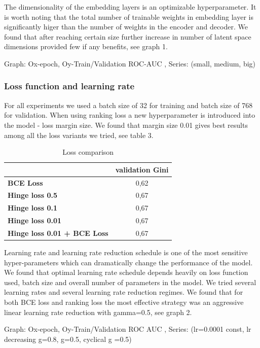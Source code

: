 \documentclass{sigkddExp}
\begin{document}
The dimensionality of the embedding layers is an optimizable hyperparameter. It is worth noting that the total number of trainable weights in embedding layer is significantly higer than the number of weights in the encoder and decoder. We found that after reaching certain size further increase in number of latent space dimensions provided few if any benefits, see graph 1.

Graph: Ox-epoch, Oy-Train/Validation ROC-AUC , Series: (small, medium, big)

\subsubsection{Loss function and learning rate}

For all experiments we used a batch size of 32 for training and batch size of 768 for validation. When using ranking loss a new hyperparameter is introduced into the model - loss margin size. We found that margin size 0.01 gives best results among all the loss variants we tried, see table 3. 

\begin{table}
\caption{Loss comparison}
\begin{tabular}{ | l | c |  }
\hline
& \textbf{validation Gini} \\
\hline
\textbf{BCE Loss} & 0,62  \\
\textbf{Hinge loss 0.5} & 0,67  \\
\textbf{Hinge loss 0.1} & 0,67  \\
\textbf{Hinge loss 0.01} & 0,67  \\
\textbf{Hinge loss 0.01 + BCE Loss} & 0,67  \\
\hline
\end{tabular}
\label{tab4}
\end{table}

Learning rate and learning rate reduction schedule is one of the most sensitive hyper-parameters which can dramatically change the performance of the model.
We found that optimal learning rate schedule depends heavily on loss function used, batch size and overall number of parameters in the model. 
We tried several learning rates and several learning rate reduction regimes. We found that for both BCE loss and ranking loss the most effective strategy was an aggressive linear learning rate reduction with gamma=0.5, see graph 2.

Graph: Ox-epoch, Oy-Train/Validation ROC AUC , Series: (lr=0.0001 const, lr decreasing g=0.8, g=0.5, cyclical g =0.5) 
\end{document}
